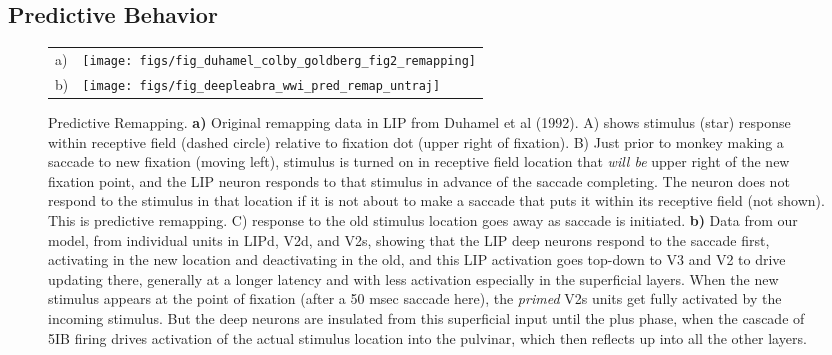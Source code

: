 \documentclass[11pt,twoside]{article}
\newif\myifpdf
\begin{document}
\subsection{Predictive Behavior}

\begin{figure}
  \begin{center}
    \begin{tabular}{ll}
      \parbox[b]{.1em}{a) \vspace*{1.4in}} &
      \texttt{[image: figs/fig\_duhamel\_colby\_goldberg\_fig2\_remapping]} \\
      \parbox[b]{.1em}{b) \vspace*{1.4in}} &
      \texttt{[image: figs/fig\_deepleabra\_wwi\_pred\_remap\_untraj]}
    \end{tabular}
  \end{center}
  \caption{Predictive Remapping.  {\bf a)} Original remapping data in LIP from Duhamel et al (1992).  A) shows stimulus (star) response within receptive field (dashed circle) relative to fixation dot (upper right of fixation).  B) Just prior to monkey making a saccade to new fixation (moving left), stimulus is turned on in receptive field location that {\em will be} upper right of the new fixation point, and the LIP neuron responds to that stimulus in advance of the saccade completing.  The neuron does not respond to the stimulus in that location if it is not about to make a saccade that puts it within its receptive field (not shown).  This is predictive remapping.  C) response to the old stimulus location goes away as saccade is initiated.  {\bf b)} Data from our model, from individual units in LIPd, V2d, and V2s, showing that the LIP deep neurons respond to the saccade first, activating in the new location and deactivating in the old, and this LIP activation goes top-down to V3 and V2 to drive updating there, generally at a longer latency and with less activation especially in the superficial layers.  When the new stimulus appears at the point of fixation (after a 50 msec saccade here), the {\em primed} V2s units get fully activated by the incoming stimulus.  But the deep neurons are insulated from this superficial input until the plus phase, when the cascade of 5IB firing drives activation of the actual stimulus location into the pulvinar, which then reflects up into all the other layers.}
  \label{fig.remap_units}
\end{figure}
\end{document}
